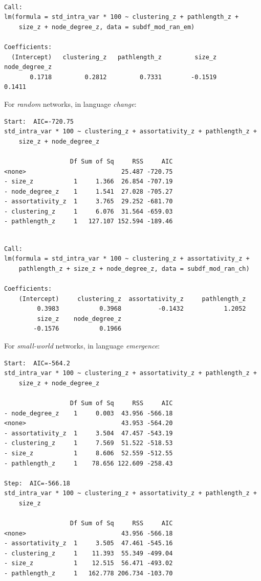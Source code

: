 \documentclass[
]{article}
\begin{document}
\begin{verbatim}

Call:
lm(formula = std_intra_var * 100 ~ clustering_z + pathlength_z + 
    size_z + node_degree_z, data = subdf_mod_ran_em)

Coefficients:
  (Intercept)   clustering_z   pathlength_z         size_z  node_degree_z  
       0.1718         0.2812         0.7331        -0.1519         0.1411  
\end{verbatim}

For \emph{random} networks, in language \emph{change}:

\begin{verbatim}
Start:  AIC=-720.75
std_intra_var * 100 ~ clustering_z + assortativity_z + pathlength_z + 
    size_z + node_degree_z

                  Df Sum of Sq     RSS     AIC
<none>                          25.487 -720.75
- size_z           1     1.366  26.854 -707.19
- node_degree_z    1     1.541  27.028 -705.27
- assortativity_z  1     3.765  29.252 -681.70
- clustering_z     1     6.076  31.564 -659.03
- pathlength_z     1   127.107 152.594 -189.46
\end{verbatim}

\begin{verbatim}

Call:
lm(formula = std_intra_var * 100 ~ clustering_z + assortativity_z + 
    pathlength_z + size_z + node_degree_z, data = subdf_mod_ran_ch)

Coefficients:
    (Intercept)     clustering_z  assortativity_z     pathlength_z  
         0.3983           0.3968          -0.1432           1.2052  
         size_z    node_degree_z  
        -0.1576           0.1966  
\end{verbatim}

For \emph{small-world} networks, in language \emph{emergence}:

\begin{verbatim}
Start:  AIC=-564.2
std_intra_var * 100 ~ clustering_z + assortativity_z + pathlength_z + 
    size_z + node_degree_z

                  Df Sum of Sq     RSS     AIC
- node_degree_z    1     0.003  43.956 -566.18
<none>                          43.953 -564.20
- assortativity_z  1     3.504  47.457 -543.19
- clustering_z     1     7.569  51.522 -518.53
- size_z           1     8.606  52.559 -512.55
- pathlength_z     1    78.656 122.609 -258.43

Step:  AIC=-566.18
std_intra_var * 100 ~ clustering_z + assortativity_z + pathlength_z + 
    size_z

                  Df Sum of Sq     RSS     AIC
<none>                          43.956 -566.18
- assortativity_z  1     3.505  47.461 -545.16
- clustering_z     1    11.393  55.349 -499.04
- size_z           1    12.515  56.471 -493.02
- pathlength_z     1   162.778 206.734 -103.70
\end{verbatim}
\end{document}

